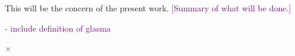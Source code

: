 This will be the concern of the present work. \textcolor{purple}{[Summary of what will be done.]}

\textcolor{purple}{- include definition of glasma}




\textcolor{purple}{$\times$}



